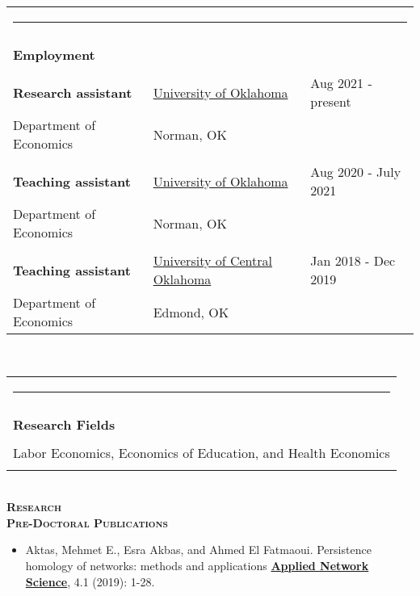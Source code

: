 \documentclass[10pt,letterpaper]{article}
\begin{document}
\begin{tabular}{p{2.75in}p{3.05in}p{4.0in}}
\multicolumn{3}{p{7.5in}}{\hrule}\\
\\
{\textbf{\large{Employment}}} & &\\
\\
\textbf{Research assistant} & \href{http://www.ou.edu/}{University of Oklahoma}& Aug 2021 - present\\
Department of Economics      & Norman, OK &\\
\\
\textbf{Teaching assistant} & \href{http://www.ou.edu/}{University of Oklahoma}& Aug 2020 - July 2021\\
Department of Economics      & Norman, OK &\\
\\
\textbf{Teaching assistant} & \href{https://www.uco.edu/}{University of Central Oklahoma}& Jan 2018 - Dec 2019\\
Department of Economics      & Edmond,  OK &\\

\end{tabular} 
\\


\begin{tabular}{p{7.5in}}
\multicolumn{1}{p{7.5in}}{\hrule}\\ \\
{\textbf{\large{Research Fields}}} \\ \\
Labor Economics,  Economics of Education,  and Health Economics
 \\ \\
\end{tabular} 


\\ 
{\large \textsc{\textbf{\large{ \indent   Research}}}} \\ 

 \textsc{\textbf{Pre-Doctoral Publications}} 

\begin{itemize}
\item Aktas,  Mehmet E., Esra Akbas, and Ahmed El Fatmaoui.  Persistence homology of networks: methods and applications \href{https://appliednetsci.springeropen.com/articles/10.1007/s41109-019-0179-3}{\textbf{Applied Network Science}},  4.1 (2019): 1-28.
\end{itemize}
\end{document}
